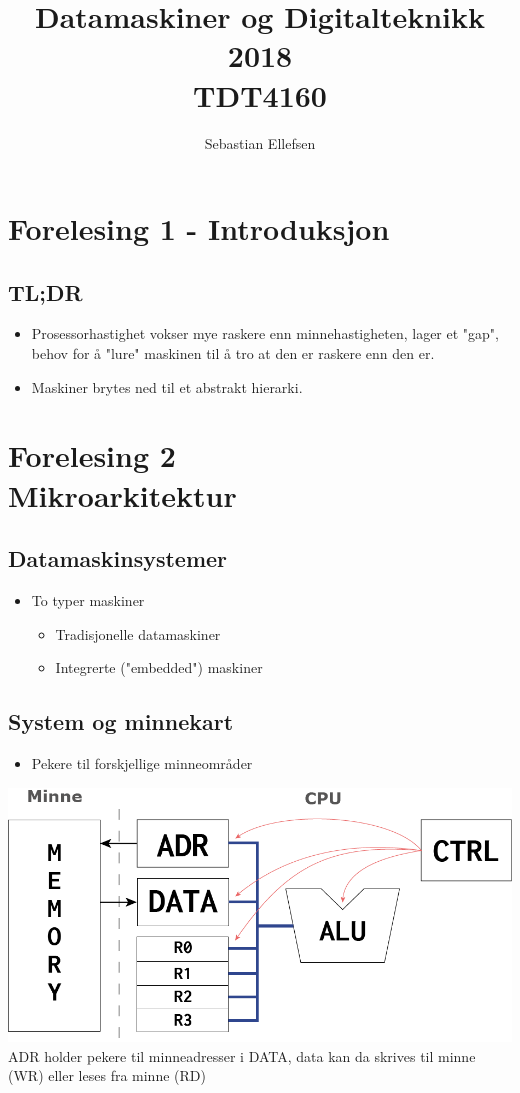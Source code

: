 \documentclass{article}
\author{Sebastian Ellefsen}
\title{%
		Datamaskiner og Digitalteknikk 2018 \\
		\large TDT4160}
\begin{document}
	\maketitle
	\section{Forelesing 1 - Introduksjon}
		\subsection{TL;DR}
			\begin{itemize}
				\item Prosessorhastighet vokser mye raskere enn minnehastigheten, lager et "gap", behov for å "lure" maskinen til å tro at den er raskere enn den er.
				\item Maskiner brytes ned til et abstrakt hierarki.
			\end{itemize}
	\section{%
		Forelesing 2 \\
		\small Mikroarkitektur}
		\subsection{Datamaskinsystemer}
			\begin{itemize}
				\item To typer maskiner
					\begin{itemize}
						\item Tradisjonelle datamaskiner
						\item Integrerte ("embedded") maskiner 
					\end{itemize}
			\end{itemize}
		\subsection{System og minnekart}
			\begin{itemize}
				\item Pekere til forskjellige minneområder
			\end{itemize}
			\includegraphics[width=\textwidth]{blokkdiagram.png} \\
			ADR holder pekere til minneadresser i DATA, data kan da skrives til minne (WR) eller leses fra minne (RD) 
\end{document}
